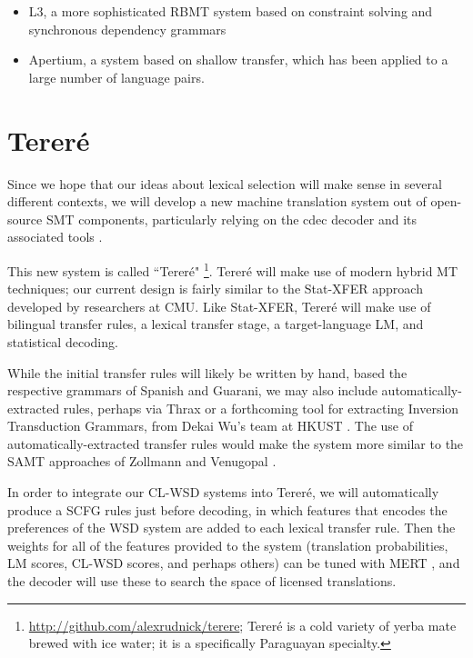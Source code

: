 \begin{itemize}
\item L3, a more sophisticated RBMT system based on constraint solving and
synchronous dependency grammars 
\item Apertium, a system based on shallow transfer, which has been
applied to a large number of language pairs.
\end{itemize}

\section{Tereré}
Since we hope that our ideas about lexical selection will make sense in several
different contexts, we will develop a new machine translation system out of
open-source SMT components, particularly relying on the cdec decoder and its
associated tools \cite{Dyer_etal_2010}.

This new system is called ``Tereré"
\footnote{\url{http://github.com/alexrudnick/terere}; 
Tereré is a cold variety of yerba mate brewed with ice water; it is a
specifically Paraguayan specialty.}.
Tereré will make use of modern hybrid MT techniques; our current design is
fairly similar to the Stat-XFER approach \cite{DBLP:conf/cicling/Lavie08}
developed by researchers at CMU.
Like Stat-XFER, Tereré will make use of bilingual transfer rules, a lexical
transfer stage, a target-language LM, and statistical decoding.

While the initial transfer rules will likely be written by hand, based the
respective grammars of Spanish and Guarani, we may also include
automatically-extracted rules, perhaps via Thrax \cite{weese-EtAl:2011:WMT} or
a forthcoming tool for extracting Inversion Transduction Grammars, from Dekai
Wu's team at HKUST \cite{saers-addanki-wu:2013:HyTra}.
The use of automatically-extracted transfer rules would make the system more
similar to the SAMT approaches of Zollmann and Venugopal
\cite{zollmann-venugopal:2006:WMT}.

In order to integrate our CL-WSD systems into Tereré, we will automatically
produce a SCFG rules just before decoding, in which features that encodes the
preferences of the WSD system are added to each lexical transfer rule. Then
the weights for all of the features provided to the system (translation
probabilities, LM scores, CL-WSD scores, and perhaps others) can be tuned with
MERT \cite{och:2003:ACL}, and the decoder will use these to search the space of
licensed translations.

